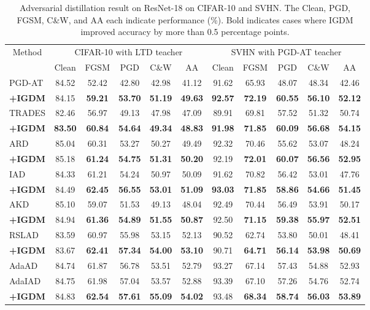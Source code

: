 \documentclass{article} %
\begin{document}
\begin{table}[t]
 \centering
 \caption{Adversarial distillation result on ResNet-18 on CIFAR-10 and SVHN. The Clean, PGD, FGSM, C\&W, and AA each indicate performance (\%). Bold indicates cases where IGDM improved accuracy by more than 0.5 percentage points.}
 \setlength{\tabcolsep}{5.5pt}
 \begin{tabular}{lcccccccccc}
 \toprule
   \multicolumn{1}{c}{\multirow{2.5}{*}{Method}}& \multicolumn{5}{c}{CIFAR-10 with LTD teacher}& \multicolumn{5}{c}{SVHN with PGD-AT teacher} \\
   \cmidrule(r){2-6}
   \cmidrule(r){7-11}
   & Clean & FGSM & PGD & C\&W & AA & Clean & FGSM & PGD & C\&W & AA \\
\midrule PGD-AT  & 84.52 & 52.42& 42.80 & 42.98& 41.12 & 91.62& 65.93& 48.07& 48.34 & 42.46\\
 \textbf{+IGDM} & 84.15 & \textbf{59.21}& \textbf{53.70} & \textbf{51.19}& \textbf{49.63} & \textbf{92.57}& \textbf{72.19}& \textbf{60.55}& \textbf{56.10} & \textbf{52.12}\\
\midrule TRADES  & 82.46 & 56.97& 49.13 & 47.98& 47.09 & 89.91& 69.81& 57.52& 51.32 & 50.74\\
 \textbf{+IGDM} &\textbf{83.50}& \textbf{60.84}& \textbf{54.64} &\textbf{49.34}& \textbf{48.83} &\textbf{91.98}& \textbf{71.85}& \textbf{60.09}& \textbf{56.68} & \textbf{54.15}\\
\midrule
 ARD & 85.04 & 60.31& 53.27 & 50.27& 49.49 & 92.32 & 70.46& 55.62 & 53.07 & 48.24\\
 \textbf{+IGDM} & 85.18 & \textbf{61.24}& \textbf{54.75} & \textbf{51.31}& \textbf{50.20} & 92.19& \textbf{72.01}& \textbf{60.07}& \textbf{56.56} & \textbf{52.95}\\
 \midrule
 IAD & 84.33 & 61.21& 54.24 & 50.97& 50.09 & 91.62& 70.82& 56.42& 53.01 & 47.76\\
 \textbf{+IGDM} & 84.49 & \textbf{62.45}& \textbf{56.55} & \textbf{53.01}& \textbf{51.09} & \textbf{93.03}& \textbf{71.85}& \textbf{58.86}& \textbf{54.66} &\textbf{51.45}\\
 \midrule
 AKD & 85.10& 59.07& 51.53& 49.13& 48.04& 92.49& 70.44& 56.49& 53.91  & 50.17\\
 \textbf{+IGDM} & 84.94& \textbf{61.36}& \textbf{54.89}& \textbf{51.55}& \textbf{50.87}& 92.50& \textbf{71.15}& \textbf{59.38}& \textbf{55.97} & \textbf{52.51}\\
 \midrule
 RSLAD & 83.59 & 60.97& 55.98 & 53.15 & 52.13 & 90.52& 62.74& 53.80& 50.01 & 48.41\\
 \textbf{+IGDM} & 83.67 & \textbf{62.41}& \textbf{57.34} & \textbf{54.00}  & \textbf{53.10} & 90.71& \textbf{64.71}& \textbf{56.14}& \textbf{53.98} & \textbf{50.69}\\
 \midrule
 AdaAD & 84.74& 61.87& 56.78 & 53.51& 52.79 & 93.27 & 67.14& 57.43 & 54.88 & 52.93\\
 AdaIAD & 84.75& 61.98& 57.04& 53.57& 52.88& 93.39& 67.10& 57.26& 54.76 & 52.74\\
 \textbf{+IGDM} & 84.83 & \textbf{62.54} & \textbf{57.61} & \textbf{55.09} & \textbf{54.02} & 93.48 & \textbf{68.34}& \textbf{58.74} & \textbf{56.03} & \textbf{53.89} \\


\end{tabular}
\end{table}
\end{document}
